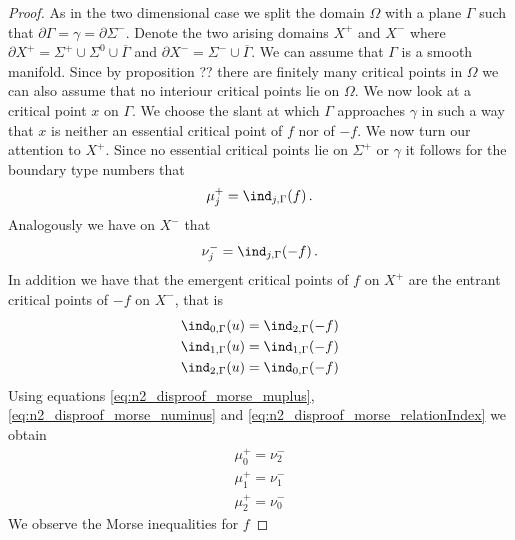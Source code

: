 \begin{proof}
  As in the two dimensional case we split the domain $\Omega$ with a plane $\Gamma$ such that
  $\partial\Gamma=\gamma=\partial\Sigma^-$.
  Denote the two arising domains $X^+$ and $X^-$ where $\partial X^+=\Sigma^+\cup\Sigma^0\cup\overline{\Gamma}$ and
  $\partial X^-=\Sigma^-\cup\overline{\Gamma}$.
  We can assume that $\Gamma$ is a smooth manifold.
  Since by proposition ?? there are finitely many critical points in $\Omega$
  we can also assume that no interiour critical points lie on $\Omega$.
  We now look at a critical point $x$ on $\Gamma$.
  We choose the slant at which $\Gamma$ approaches $\gamma$ in such a way that $x$
  is neither an essential critical point of $f$ nor of $-f$.
  We now turn our attention to $X^+$. Since no essential critical points lie on $\Sigma^+$ or
  $\gamma$ it follows for the boundary type numbers that
  \begin{align}
    \mu^+_j=\ind_{j,\Gamma}(f)\,.\label{eq:n2_disproof_morse_muplus}
  \end{align}
  Analogously we have on $X^-$ that
  \begin{align}
    \nu^-_j=\ind_{j,\Gamma}(-f)\,.\label{eq:n2_disproof_morse_numinus}
  \end{align}
  In addition we have that the emergent critical points of $f$ on $X^+$ are the
  entrant critical points of $-f$ on $X^-$, that is
  \begin{equation}
    \begin{aligned}
      \ind_{0,\Gamma}(u)=\ind_{2,\Gamma}(-f) \\
      \ind_{1,\Gamma}(u)=\ind_{1,\Gamma}(-f) \\
      \ind_{2,\Gamma}(u)=\ind_{0,\Gamma}(-f)\label{eq:n2_disproof_morse_relationIndex} 
    \end{aligned}
  \end{equation}
  Using equations \eqref{eq:n2_disproof_morse_muplus}, \eqref{eq:n2_disproof_morse_numinus} and \eqref{eq:n2_disproof_morse_relationIndex}
  we obtain
  \begin{equation}
    \begin{aligned}
      \mu^+_0=\nu^-_2 \\
      \mu^+_1=\nu^-_1 \\
      \mu^+_2=\nu^-_0\label{eq:n2_disproof_morse_relationMuNu}
    \end{aligned}
  \end{equation}
  We observe the Morse inequalities for $f$

\end{proof}
